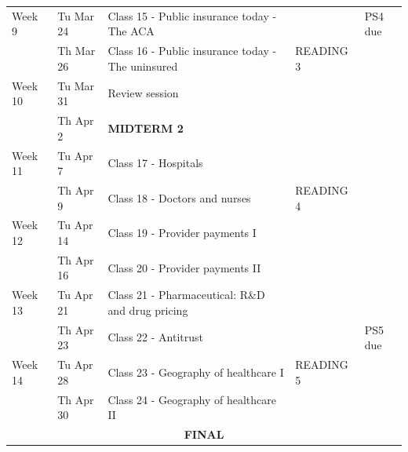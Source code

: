 \documentclass[12pt]{article}
\begin{document}
\begin{tabularx}{\linewidth}{l l X l l}
  Week 9
  & Tu Mar 24 & Class 15 - Public insurance today - The ACA &  & PS4 due \\
  & Th Mar 26 & Class 16 - Public insurance today - The uninsured & READING 3 &  \\
  
  Week 10
  & Tu Mar 31 & Review session &  &  \\
  & Th Apr 2 & \textbf{MIDTERM 2} &  &  \\
  
  Week 11
  & Tu Apr 7 & Class 17 - Hospitals &  &  \\
  & Th Apr 9 & Class 18 - Doctors and nurses & READING 4 &  \\
  
  Week 12
  & Tu Apr 14 & Class 19 - Provider payments I &  &  \\
  & Th Apr 16 & Class 20 - Provider payments II &  &  \\
  
  Week 13
  & Tu Apr 21 & Class 21 - Pharmaceutical: R\&D and drug pricing &  &  \\
  & Th Apr 23 & Class 22 - Antitrust &  & PS5 due \\
  
  Week 14
  & Tu Apr 28 & Class 23 - Geography of healthcare I & READING 5 &  \\
  & Th Apr 30 & Class 24 - Geography of healthcare II &  &  \\
  
  \hline
  \multicolumn{5}{c}{\textbf{FINAL}} \\
  \hline
  
  \end{tabularx}

\clearpage
\end{document}
